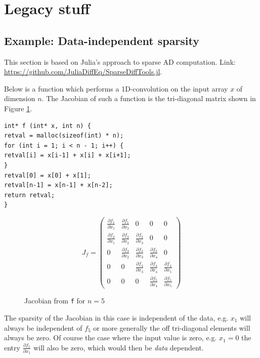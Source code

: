 \newpage 
\section{Legacy stuff}
\subsection{Example: Data-independent sparsity}

This section is based on Julia's approach to sparse AD computation. 
Link: \url{https://github.com/JuliaDiffEq/SparseDiffTools.jl}. 

Below is a function which performs a 1D-convolution on the input array $x$ of dimension $n$. 
The Jacobian of such a function is the tri-diagonal matrix shown in Figure \ref{fig:tridiag}. 
\begin{verbatim}
int* f (int* x, int n) {
retval = malloc(sizeof(int) * n);
for (int i = 1; i < n - 1; i++) {
retval[i] = x[i-1] + x[i] + x[i+1];
}
retval[0] = x[0] + x[1];
retval[n-1] = x[n-1] + x[n-2];
return retval;
}
\end{verbatim}
\begin{figure}[H]
	$$ J_{f} = \left(\begin{matrix}
	\frac{\partial f_1}{\partial x_1} & \frac{\partial f_1}{\partial x_2} & 0 & 0 & 0 \\
	\frac{\partial f_2}{\partial x_1}& \frac{\partial f_2}{\partial x_2} & \frac{\partial f_2}{\partial x_3} & 0 & 0\\
	0 & \frac{\partial f_3}{\partial x_2} & \frac{\partial f_3}{\partial x_3} & \frac{\partial f_3}{\partial x_4} & 0\\
	0 & 0 & \frac{\partial f_4}{\partial x_3} & \frac{\partial f_4}{\partial x_4} & \frac{\partial f_4}{\partial x_5} \\
	0 & 0 & 0 & \frac{\partial f_5}{\partial x_4} & \frac{\partial f_5}{\partial x_5}
	\end{matrix}\right) $$
	\caption{Jacobian from \texttt{f} for $n=5$}
	\label{fig:tridiag}
\end{figure}
The sparsity of the Jacobian in this case is independent of the data, e.g. $x_1$ will always be independent of $f_5$ 
or more generally the off tri-diagonal elements will always be zero. 
Of course the case where the input value is zero, e.g. $x_1 = 0$  the entry $\frac{\partial f_1}{\partial x_1}$ will also be zero, which would then be \emph{data} dependent.

